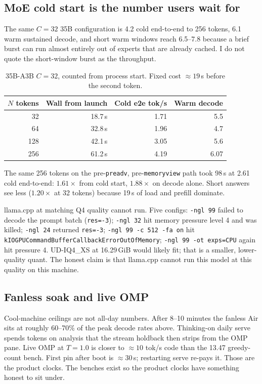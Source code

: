 \subsection{MoE cold start is the number users wait for}

The same $C{=}32$ 35B configuration is 4.2 cold end-to-end to 256 tokens, 6.1 warm sustained decode, and short warm windows reach 6.5--7.8 because a brief burst can run almost entirely out of experts that are already cached. I do not quote the short-window burst as the throughput.

\begin{table}[ht]
\centering
\caption{35B-A3B $C{=}32$, counted from process start. Fixed cost $\approx 19$\,s before the second token.}
\label{tab:moeN}
\begin{tabular}{@{}rrrr@{}}
\toprule
$N$ tokens & Wall from launch & Cold e2e tok/s & Warm decode \\
\midrule
32 & 18.7\,s & 1.71 & 5.5 \\
64 & 32.8\,s & 1.96 & 4.7 \\
128 & 42.1\,s & 3.05 & 5.6 \\
256 & 61.2\,s & 4.19 & 6.07 \\
\bottomrule
\end{tabular}
\end{table}

The same 256 tokens on the pre-\texttt{preadv}, pre-\texttt{memoryview} path took 98\,s at 2.61 cold end-to-end: $1.61\times$ from cold start, $1.88\times$ on decode alone. Short answers see less ($1.20\times$ at 32 tokens) because 19\,s of load and prefill dominate.

llama.cpp at matching Q4 quality cannot run. Five configs: \texttt{-ngl 99} failed to decode the prompt batch (\texttt{res=-3}); \texttt{-ngl 32} hit memory pressure level 4 and was killed; \texttt{-ngl 24} returned \texttt{res=-3}; \texttt{-ngl 99 -c 512 -fa on} hit \texttt{kIOGPUCommandBufferCallbackErrorOutOfMemory}; \texttt{-ngl 99 -ot exps=CPU} again hit pressure 4. UD-IQ4\_XS at 16.29\,GiB would likely fit; that is a smaller, lower-quality quant. The honest claim is that llama.cpp cannot run this model at this quality on this machine.

\subsection{Fanless soak and live OMP}

Cool-machine ceilings are not all-day numbers. After 8--10 minutes the fanless Air sits at roughly 60--70\% of the peak decode rates above. Thinking-on daily serve spends tokens on analysis that the stream holdback then strips from the OMP pane. Live OMP at $T{=}1.0$ is closer to $\approx 10$ tok/s code than the 13.47 greedy-count bench. First pin after boot is $\approx 30$\,s; restarting serve re-pays it. Those are the product clocks. The benches exist so the product clocks have something honest to sit under.

